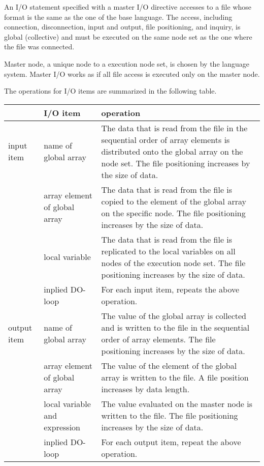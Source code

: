    An I/O statement specified with a master I/O directive accesses to a
   file whose format is the same as the one of the base language.
   The access, including connection, disconnection, input and output,
   file positioning, and inquiry, is global (collective) and must be
   executed on the same node set as the one where the file was
   connected. 

   Master node, a unique node to a execution node set, is chosen by the
   language system.
   Master I/O works as if all file access is executed only on the master
   node.

   The operations for I/O items are summarized in the following table.

   \begin{table}[h]
    \begin{center}
     \begin{tabular}{|l|p{40mm}|p{80mm}|}
      \hline
      \multicolumn{1}{|c}{ }  & {\bf I/O item} & {\bf operation} \\
      \hline
      input item & name of global array & The data that is read 
	      from the file in the sequential order of array elements is distributed onto 
	      the global array on the node set. The file positioning increases by
	      the size of data. \\
      \cline{2-3}
      & array element of global array &  The data that is read from the file
	      is copied to the element of the global array on the specific node.
	      The file positioning increases by the size of data. \\
      \cline{2-3}
      & local variable & The data that is read from the file is replicated to the
	      local variables on all nodes of the execution node
	      set. The file positioning increases by the size of data. \\
      \cline{2-3}
      & inplied DO-loop & For each input item, repeats the above operation. \\
      \hline
      output item & name of global array & The value of the
	      global array is collected and is written to the
	      file in the sequential order of array elements. The file
	      positioning increases by the size of data. \\
      \cline{2-3}
      & array element of global array &  The value of the element of the
	      global array is written to the
	      file. A file position increases by data length. \\
      \cline{2-3}
      & local variable and expression & The value evaluated on the master node
	      is written to the file. The file positioning increases by
	      the size of data. \\
      \cline{2-3}
      & inplied DO-loop & For each output item, repeat the above operation. \\
      \hline
      \end{tabular}
     \end{center}
    \label{tb:aaa}
   \end{table}

